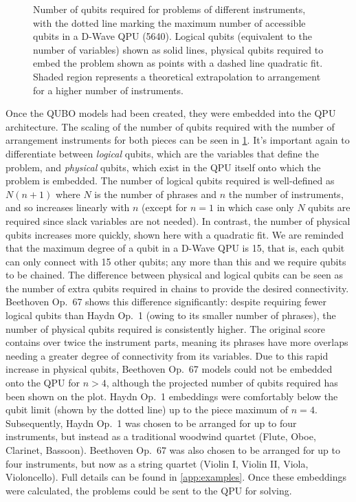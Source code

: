 \documentclass[12pt]{article}
\theoremstyle{definition}
\begin{document}
\begin{figure}[!t]
    \centering\footnotesize
    
    \caption{Number of qubits required for problems of different instruments, with the dotted line marking the maximum number of accessible qubits in a D-Wave QPU (\num{5640}). Logical qubits (equivalent to the number of variables) shown as solid lines, physical qubits required to embed the problem shown as points with a dashed line quadratic fit. Shaded region represents a theoretical extrapolation to arrangement for a higher number of instruments.}
    \label{fig:qubits}
\end{figure}

Once the QUBO models had been created, they were embedded into the QPU architecture. The scaling of the number of qubits required with the number of arrangement instruments for both pieces can be seen in \cref{fig:qubits}. It's important again to differentiate between \emph{logical} qubits, which are the variables that define the problem, and \emph{physical} qubits, which exist in the QPU itself onto which the problem is embedded. The number of logical qubits required is well-defined as $N(n+1)$ where $N$ is the number of phrases and $n$ the number of instruments, and so increases linearly with $n$ (except for $n=1$ in which case only $N$ qubits are required since slack variables are not needed). In contrast, the number of physical qubits increases more quickly, shown here with a quadratic fit. We are reminded that the maximum degree of a qubit in a D-Wave QPU is \num{15}, that is, each qubit can only connect with \num{15} other qubits; any more than this and we require qubits to be chained. The difference between physical and logical qubits can be seen as the number of extra qubits required in chains to provide the desired connectivity. Beethoven Op.\ 67 shows this difference significantly: despite requiring fewer logical qubits than Haydn Op.\ 1 (owing to its smaller number of phrases), the number of physical qubits required is consistently higher. The original score contains over twice the instrument parts, meaning its phrases have more overlaps needing a greater degree of connectivity from its variables. Due to this rapid increase in physical qubits, Beethoven Op.\ 67 models could not be embedded onto the QPU for $n>4$, although the projected number of qubits required has been shown on the plot. Haydn Op.\ 1 embeddings were comfortably below the qubit limit (shown by the dotted line) up to the piece maximum of $n=4$. Subsequently, Haydn Op.\ 1 was chosen to be arranged for up to four instruments, but instead as a traditional woodwind quartet (Flute, Oboe, Clarinet, Bassoon). Beethoven Op.\ 67 was also chosen to be arranged for up to four instruments, but now as a string quartet (Violin I, Violin II, Viola, Violoncello). Full details can be found in \cref{app:examples}. Once these embeddings were calculated, the problems could be sent to the QPU for solving.
\end{document}
